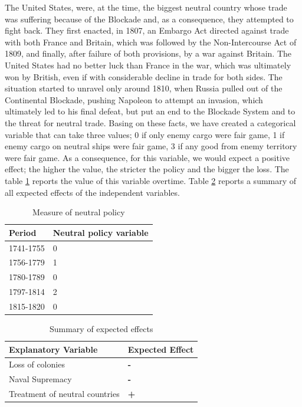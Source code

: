 \documentclass[12pt,a4paper,notitlepage,english]{article}
\begin{document}
The United States, were, at the time, the biggest neutral country whose trade was suffering because of the Blockade and, as a consequence, they attempted to fight back. They first enacted, in 1807, an Embargo Act directed against trade with both France and Britain, which was followed by the Non-Intercourse Act of 1809, and finally, after failure of both provisions, by a war against Britain. The United States had no better luck than France in the war, which was ultimately won by British, even if with considerable decline in trade for both sides. The situation started to unravel only around 1810, when Russia pulled out of the Continental Blockade, pushing Napoleon to attempt an invasion, which ultimately led to his final defeat, but put an end to the Blockade System and to the threat for neutral trade. Basing on these facts, we have created a categorical variable that can take three values; 0 if only enemy cargo were fair game, 1 if enemy cargo on neutral ships were fair game, 3 if any good from enemy territory  were fair game. As a consequence, for this variable, we would expect a positive effect; the higher the value, the stricter the policy and the bigger the loss. The table \ref{neutral_policy} reports the value of this variable overtime. Table \ref{summary} reports a summary of all expected effects of the independent variables. 
\begin{table}[H]
\centering
\caption{Measure of neutral policy}
\label{neutral_policy}
\begin{tabular}{ll}
\hline \hline
Period & Neutral policy variable  \\ \hline
1741-1755 & 0                  \\
1756-1779 & 1       \\
1780-1789 & 0                 \\
1797-1814 & 2                 \\
1815-1820 & 0                 \\
\hline 
\end{tabular}
\end{table}

\begin{table}[H]
\centering
\caption{Summary of expected effects}
\label{summary}
\begin{tabular}{ll}
\hline \hline
Explanatory Variable & Expected Effect  \\ \hline
Loss of colonies & \textbf{-}                  \\
Naval Supremacy & \textbf{-}                 \\
Treatment of neutral countries &       \textbf{+}      \\ \hline 
\end{tabular}
\end{table}
\end{document}
